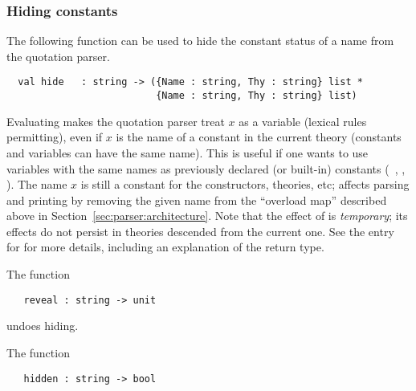 \subsubsection{Hiding constants}
\label{hidden}

%
The following function can be used to hide the constant status of a
name from the quotation parser.

\begin{holboxed}
\begin{verbatim}
  val hide   : string -> ({Name : string, Thy : string} list *
                          {Name : string, Thy : string} list)
\end{verbatim}
\end{holboxed}

\noindent Evaluating 
makes the quotation parser treat $x$ as a variable (lexical
rules permitting), even if $x$ is the name of a constant in the current theory
(constants and variables can have the same name).
This is useful if one wants to use variables
%
%
with the same names as previously declared (or built-in) constants
(\eg\ , ,  \etc).  The name $x$ is still a constant
for the constructors, theories, etc;  affects parsing and
printing by removing the given name from the ``overload map'' described
above in Section~\ref{sec:parser:architecture}.  Note that the effect
of  is \emph{temporary}; its effects do not persist in
theories descended from the current one. See the \REFERENCE{} entry
for  for more details, including an explanation of the return
type.

The function

\begin{holboxed}
\begin{verbatim}
   reveal : string -> unit
\end{verbatim}
\end{holboxed}

\noindent undoes hiding.

The function

\begin{holboxed}
\begin{verbatim}
   hidden : string -> bool
\end{verbatim}
\end{holboxed}

